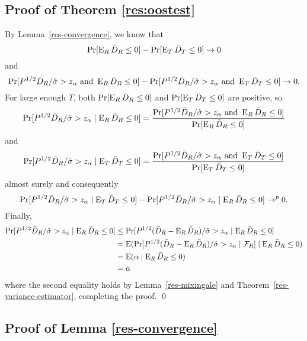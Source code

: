\documentclass[11pt]{article}
\begin{document}
\subsection*{Proof of Theorem \ref{res:oostest}}
By Lemma~\ref{res-convergence}, we know that
\begin{equation*}
  \Pr[\operatorname{E}_R \bar{D}_{R} \leq 0] - \Pr[\operatorname{E}_T \bar{D}_{T} \leq 0] \to 0
\end{equation*}
and
\begin{equation*}
  \Pr[P^{1/2} \bar{D}_{R} / \hat{\sigma} > z_\alpha \text{ and } \operatorname{E}_R \bar{D}_{R} \leq 0]
  - \Pr[P^{1/2} \bar{D}_{R} / \hat{\sigma} > z_\alpha \text{ and }
  \operatorname{E}_T \bar{D}_{T} \leq 0] \to 0.
\end{equation*}
For large enough $T$, both $\Pr[\operatorname{E}_R \bar{D}_{R} \leq 0]$ and $\Pr[\operatorname{E}_T
\bar{D}_{T} \leq 0]$ are positive, so
\begin{equation*}
  \Pr[P^{1/2} \bar{D}_{R} / \hat{\sigma} > z_\alpha
  \mid \operatorname{E}_R \bar{D}_{R} \leq 0] =
  \frac{\Pr[P^{1/2} \bar{D}_{R} / \hat{\sigma} > z_\alpha \text{ and }
    \operatorname{E}_R \bar{D}_{R} \leq 0]}{\Pr[\operatorname{E}_R \bar{D}_{R} \leq 0]}
\end{equation*}
and
\begin{equation*}
  \Pr[P^{1/2} \bar{D}_{R} / \hat{\sigma} > z_\alpha
  \mid \operatorname{E}_T \bar{D}_{T} \leq 0] =
  \frac{\Pr[P^{1/2} \bar{D}_{R} / \hat{\sigma} > z_\alpha \text{ and }
    \operatorname{E}_T \bar{D}_{T} \leq 0]}{\Pr[\operatorname{E}_T \bar{D}_{T} \leq 0]}
\end{equation*}
almost surely and consequently
\begin{equation*}
  \Pr[P^{1/2} \bar{D}_{R} / \hat{\sigma} > z_\alpha
  \mid \operatorname{E}_T \bar{D}_{T} \leq 0]
  - \Pr[P^{1/2} \bar{D}_{R} / \hat{\sigma} > z_\alpha
  \mid \operatorname{E}_R \bar{D}_{R} \leq 0] \to^p 0.
\end{equation*}
Finally,
\begin{align*}
  \Pr[P^{1/2} \bar{D}_{R} / \hat{\sigma} > z_\alpha \mid \operatorname{E}_R \bar{D}_{R} \leq 0]
  &\leq \Pr[P^{1/2} (\bar{D}_{R} - \operatorname{E}_R \bar{D}_{R}) / \hat{\sigma} > z_\alpha
  \mid \operatorname{E}_R \bar{D}_{R} \leq 0] \\
  &= \operatorname{E}( \Pr[P^{1/2} (\bar{D}_{R} - \operatorname{E}_R \bar{D}_{R}) / \hat{\sigma} > z_\alpha
  \mid \mathcal{F}_R] \mid \operatorname{E}_R \bar{D}_{R} \leq 0) \\
  &= \operatorname{E}(\alpha \mid \operatorname{E}_R \bar{D}_{R} \leq 0) \\
  &= \alpha
\end{align*}
where the second equality holds by Lemma~\ref{res-mixingale} and
Theorem~\ref{res-variance-estimator}, completing the proof.
\qed

\subsection*{Proof of Lemma \ref{res-convergence}}
\newcommand{\resConvgRHS}[1]{\ensuremath{\E(L(y^* - x_1^{*\prime}\bh{1#1}) - L(y^{*} -
x_2^{*\prime}\bh{2#1}) \mid \bh{#1})}}
\newcommand{\resConvgEstDiff}[1]{\ensuremath{\E(L(y^{*} -
    x_{#1}^{*\prime}\bh{#1R}) \mid \bh{R}) -
\E(L(y^{*} - x_{#1}^{*\prime}\bh{#1T}) \mid \bh{T})}}
\newcommand{\resConvgEstDiffRV}[1]{\ensuremath{L(y^{*} -
    x_{#1}^{*\prime}\bh{#1R}) - L(y^{*} - x_{#1}^{*\prime}\bh{#1T})}}
\end{document}
